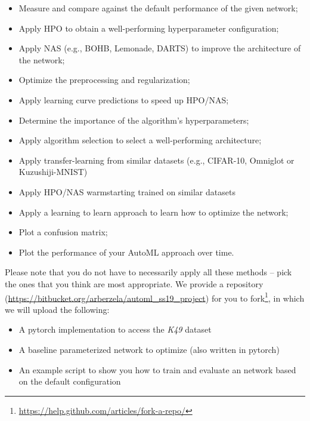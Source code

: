 \documentclass[10pt,a4paper]{article}
\begin{document}
		\begin{itemize}
			\item Measure and compare against the default performance of the given network;
			\item Apply HPO to obtain a well-performing hyperparameter configuration;
			\item Apply NAS (e.g., BOHB, Lemonade, DARTS) to improve the architecture of the network;
			\item Optimize the preprocessing and regularization;
			\item Apply learning curve predictions to speed up HPO/NAS;
			\item Determine the importance of the algorithm's hyperparameters;
			\item Apply algorithm selection to select a well-performing architecture;
			\item Apply transfer-learning from similar datasets (e.g., CIFAR-10, Omniglot or Kuzushiji-MNIST)
			\item Apply HPO/NAS warmstarting trained on similar datasets 
			\item Apply a learning to learn approach to learn how to optimize the network;
			\item Plot a confusion matrix;
			\item Plot the performance of your AutoML approach over time.
		\end{itemize}
		\noindent
		Please note that you do not have to necessarily apply all these methods -- pick the ones that you think are most appropriate.
		We provide a repository (\url{https://bitbucket.org/arberzela/automl\_ss19\_project}) for you to fork\footnote{\url{https://help.github.com/articles/fork-a-repo/}}, in which we will upload the following:
		\begin{itemize}
			\item A pytorch implementation to access the \textit{K49} dataset
			\item A baseline parameterized network to optimize (also written in pytorch)
			\item An example script to show you how to train and evaluate an network based on the default configuration
		\end{itemize}
\end{document}
